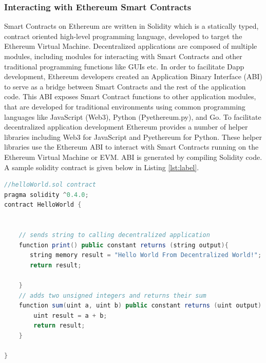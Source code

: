 \subsubsection{Interacting with Ethereum Smart Contracts}
Smart Contracts on Ethereum are written in Solidity which is a statically typed, contract oriented high-level programming language, developed to target the Ethereum Virtual Machine. Decentralized applications are composed of multiple modules, including modules for interacting with Smart Contracts and other traditional programming functions like GUIs etc. In order to facilitate Dapp development, Ethereum developers created an Application Binary Interface (ABI) to serve as a bridge between Smart Contracts and the rest of the application code. This ABI exposes Smart Contract functions to other application modules, that are developed for traditional environments using common programming languages like JavaScript (Web3), Python (Pyethereum.py), and Go.  To facilitate decentralized application development Ethereum provides a number of helper libraries including Web3 for JavaScript and Pyethereum for Python. These helper libraries use the Ethereum ABI to interact with Smart Contracts running on the Ethereum Virtual Machine or EVM. ABI is generated by compiling Solidity code. A sample solidity contract is given below in Listing \ref{lst:label}. 


\begin{lstlisting}[language=Java,frame=single,tabsize=2,showspaces=false,showstringspaces=false,
  keywordstyle=\color{blue},morekeywords={function,returns,constant,memory},caption={Hello world Solidity Program}, label={lst:label}]
//helloWorld.sol contract
pragma solidity ^0.4.0;
contract HelloWorld {


    // sends string to calling decentralized application
    function print() public constant returns (string output){
       string memory result = "Hello World From Decentralized World!";
       return result;

    }
    // adds two unsigned integers and returns their sum
    function sum(uint a, uint b) public constant returns (uint output) {
        uint result = a + b;
        return result;
    }

}
\end{lstlisting}
\clearpage



